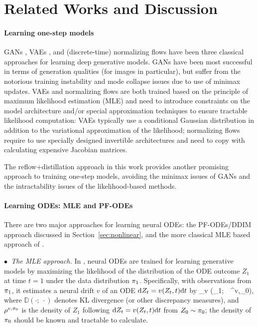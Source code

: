 \section{Related Works and Discussion}

\paragraph{Learning one-step models}
GANs \citep{goodfellow2014generative, arjovsky2017wasserstein, liu2021fusedream}, VAEs \citep{kingma2013auto}, and (discrete-time) normalizing flows  \citep{rezende2015variational, dinh2014nice,dinh2016density}
have been three classical approaches for learning deep generative models. %
GANs have been most successful in terms of  generation qualities (for images in particular), but suffer from the notorious training instability and mode collapse issues due to use of minimax updates. 
  VAEs and normalizing flows are both trained based on the principle of maximum likelihood estimation (MLE) and  need to introduce constraints on the model architecture and/or special approximation techniques to ensure tractable likelihood computation: 
  VAEs typically use a conditional Gaussian distribution in addition to the variational approximation of the likelihood; 
  normalizing flows require to use specially designed invertible architectures and need to copy with calculating expensive Jacobian matrices.   
 
 The reflow+distillation approach in this work provides another promising approach to  training one-step models,  avoiding the minimax issues of GANs and the intractability issues of the likelihood-based methods. 

\paragraph{Learning ODEs: MLE and PF-ODEs} %
There are two major approaches for learning neural ODEs: 
the PF-ODEs/DDIM approach discussed in Section~\ref{sec:nonlinear}, and the more classical MLE based approach
 of \cite{chen2018neural}. 

\emph{$\bullet$~The MLE approach.}  
In \cite{chen2018neural}, 
neural ODEs are trained 
for learning generative models by maximizing the likelihood of the distribution of the ODE outcome $Z_1$ at time $t=1$ under the data distribution ${\pi}_1$. Specifically, 
with observations from ${\pi}_1$, it estimates a neural drift $v$ of an ODE  $\mathrm{d} Z_t = v(Z_t,t)\mathrm{d}t $ by 
\bbb \label{equ:neuralode}
\max_{v}  (\tg_1;~~\rho^{v,\tg_0}), 
\eee 
where $\mathbb{D}(\cdot;~\cdot)$ denotes 
KL divergence (or other discrepancy measures),  and $\rho^{v,{\pi}_0}$ is the density of $Z_1$ following $\mathrm{d} Z_t = v(Z_t,t)\mathrm{d}t $ from $Z_0\sim {\pi}_0$; the density of ${\pi}_0$ should be known and tractable to calculate. 

